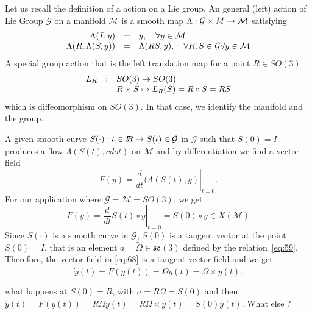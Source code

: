 Let us recall the definition of a action on a Lie group. An general (left)  action of Lie Group $\mathcal G$ on a manifold $\mathcal M$ is a smooth map $\Lambda: \mathcal G \times \mathcal \mathcal M \rightarrow \mathcal M$ satisfying
\begin{equation}
  \label{eq:66}
  \begin{array}[lcl]{rcl}
    \Lambda(I,y) &=& y, \quad \forall y \in \mathcal M \\
    \Lambda(R,\Lambda(S,y)) &=& \Lambda(RS,y) , \quad \forall R,S \in \mathcal G  \forall y \in \mathcal M \\
  \end{array}
\end{equation}
A special group action that is  the left translation map for a point $R \in SO(3)$ 
\begin{equation}
  \label{eq:65}
  \begin{array}[lcl]{rcl}
    L_R& :  & SO(3)  \rightarrow  SO(3)\\
            & & R \times S  \mapsto L_R(S) = R \circ S = RS\\
  \end{array}
\end{equation}
which is diffeomorphism on $SO(3)$. In that case, we identify the manifold and the group.

A given smooth curve  $S(\cdot) : t\in \mbox{\rm $I\!\!R$} \mapsto S(t)\in \mathcal G$ in $\mathcal G$ such that $S(0)= I$ produces a flow $\Lambda(S(t),cdot)$ on $\mathcal M$ and by differentiation we find a vector field
\begin{equation}
  \label{eq:67}
    F(y) = \left. \frac{d}{dt} (\Lambda(S(t),y) \right|_{t=0}.
\end{equation}
For our application where  $\mathcal G = \mathcal M = SO(3)$, we get
\begin{equation}
  \label{eq:68}
  F(y) = \left. \frac{d}{dt} S(t)\circ y \right|_{t=0} = \dot S(0) \circ y \in X(\mathcal M)
\end{equation}
Since $S(\cdot)$ is a smooth curve in $\mathcal G$, $\dot S(0)$ is a tangent vector at the point $S(0)=I$, that is an element $a = \tilde \Omega  \in \mathfrak{so}(3) $ defined by the relation~\eqref{eq:59}. Therefore, the vector field in \eqref{eq:68} is a tangent vector field and we get
\begin{equation}
  \label{eq:70}
  \dot y(t) = F(y(t)) = \tilde \Omega y(t) = \Omega \times y(t).
\end{equation}

\begin{ndrva}
  what happens at $S(0)=R$, with $ a =R \tilde \Omega =\dot S(0)$ and then $\dot y(t) = F(y(t)) = R \tilde \Omega y(t) =  R\Omega \times y(t)= \dot S(0) y(t) $. What else ? 
\end{ndrva}



